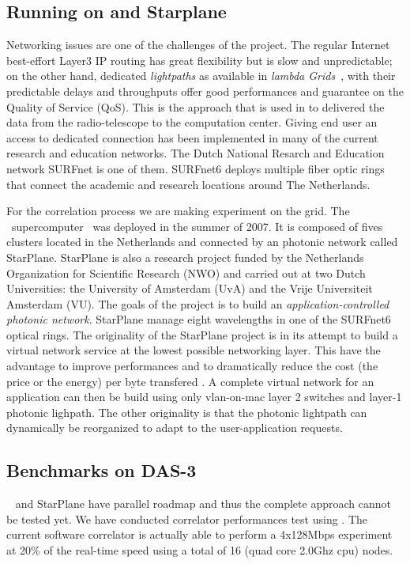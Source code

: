 \subsection{Running \scarie on  and Starplane}
Networking issues are one of the challenges of the \scarie project. 
The regular Internet best-effort Layer3 IP routing has great
flexibility but is slow and unpredictable; on the other hand,
dedicated \textit{lightpaths} as available in 
\textit{lambda Grids}~\cite{eslea-2007}, with their predictable delays and
throughputs offer good performances and guarantee on the Quality of
Service (QoS). This is the approach that is used in \scarie to delivered 
the data from the radio-telescope to the 
computation center. Giving end user an access
to dedicated connection has been implemented in many of the current
research and education networks. The Dutch National Resarch and
Education network SURFnet is one of them. SURFnet6 deploys multiple
fiber optic rings that connect the academic and research locations
around The Netherlands. 

For the correlation process we are making experiment on the  
grid. The \ supercomputer~\cite{das3} was deployed in the summer of
2007. It is composed of fives clusters located in the Netherlands and
connected by an photonic network called StarPlane. StarPlane is also a
research project funded by the Netherlands Organization for Scientific
Research (NWO) and carried out at two Dutch Universities: the
University of Amsterdam (UvA) and the Vrije Universiteit Amsterdam
(VU). The goals of the project is to build an \textit{application-controlled 
photonic network}. StarPlane manage eight wavelengths in one of the SURFnet6 
optical rings. The originality of the StarPlane project 
is in its attempt to build a virtual network service at the lowest possible networking 
layer. This have the advantage to improve performances and to dramatically 
reduce the cost (the price or the energy) per byte transfered \cite{}. 
A complete virtual network for an application can then be build using only
vlan-on-mac layer 2 switches and layer-1 photonic lighpath. The other originality 
is that the photonic lightpath can dynamically be reorganized to adapt to the
user-application requests. 


\subsection{Benchmarks on DAS-3}
\scarie~ and StarPlane have parallel roadmap and thus the complete 
approach cannot be tested yet. We have conducted correlator performances test 
using . The current software correlator is actually able to 
perform a 4x128Mbps experiment at 20\% of the real-time speed using a total of 16 (quad core 2.0Ghz cpu) nodes. 

